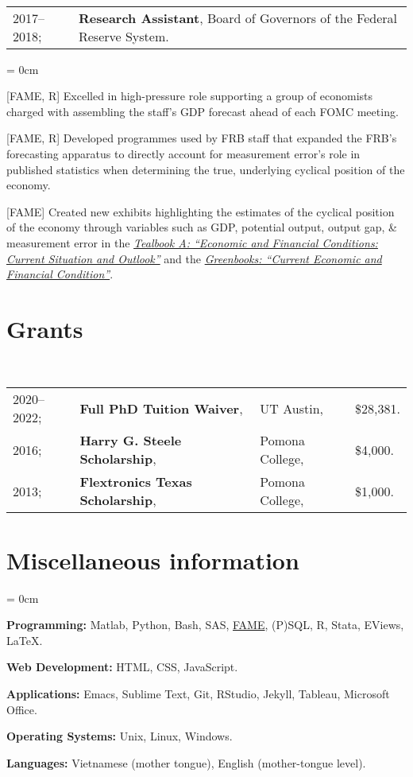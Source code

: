 \documentclass[a4paper, 11pt]{article}
\begin{document}
  ~\begin{tabular}{ll}
    2017--2018; & \textbf{Research Assistant}, Board of Governors of the Federal Reserve System.
  \end{tabular}
  \begin{compactitem}\parskip = 0cm
    \item {[FAME, R]} Excelled in high-pressure role supporting a group of economists charged with assembling the staff's GDP forecast ahead of each FOMC meeting.
    \item {[FAME, R]} Developed programmes used by FRB staff that expanded the FRB's forecasting apparatus to directly account for measurement error's role in published statistics when determining the true, underlying cyclical position of the economy.
    \item {[FAME]} Created new exhibits highlighting the estimates of the cyclical position of the economy through variables such as GDP, potential output, output gap, \& measurement error in the \href{https://www.federalreserve.gov/monetarypolicy/fomc_historical.htm#tealbooks}{\textit{Tealbook A: ``Economic and Financial Conditions: Current Situation and Outlook''}} and the \href{https://www.federalreserve.gov/monetarypolicy/fomc_historical.htm#greenbooks}{\textit{Greenbooks: ``Current Economic and Financial Condition''}}.
  \end{compactitem}
  \vspace*{0.25em}
      
  \section{Grants}
  ~\begin{tabular}{llll}
    2020--2022; & \textbf{Full PhD Tuition Waiver}, & UT Austin, & \$28,381.\\
    2016; & \textbf{Harry G. Steele Scholarship}, & Pomona College, & \$4,000.\\
    2013; & \textbf{Flextronics Texas Scholarship}, & Pomona College, & \$1,000.
  \end{tabular}
  \vspace*{0.25em}
    
  \section{Miscellaneous information}
  \begin{compactitem}\parskip = 0cm
    \item \textbf{Programming:} Matlab, Python, Bash, SAS, \href{https://en.wikipedia.org/wiki/FAME_(database)}{FAME}, (P)SQL, R, Stata, EViews, \LaTeX.
    \item \textbf{Web Development:} HTML, CSS, JavaScript.
    \item \textbf{Applications:} Emacs, Sublime Text, Git, RStudio, Jekyll, Tableau, Microsoft Office.
    \item \textbf{Operating Systems:} Unix, Linux, Windows.
    \item \textbf{Languages:} Vietnamese (mother tongue), English (mother-tongue level).
  \end{compactitem}
\end{document}

